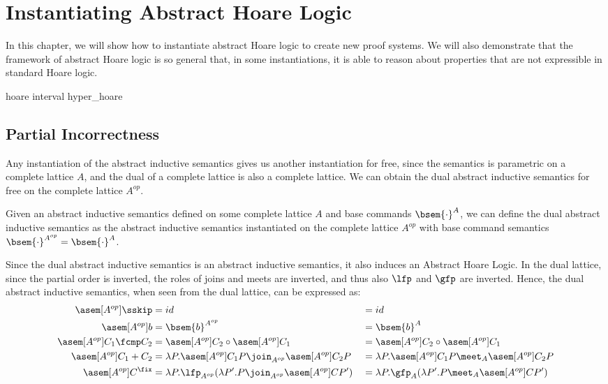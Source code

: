 \chapter{Instantiating Abstract Hoare Logic}

In this chapter, we will show how to instantiate abstract Hoare logic to create 
new proof systems. We will also demonstrate that the framework of abstract Hoare 
logic is so general that, in some instantiations, it is able to reason about 
properties that are not expressible in standard Hoare logic.

{hoare}
{interval}
{hyper_hoare}

\section{Partial Incorrectness}

Any instantiation of the abstract inductive semantics gives us another
instantiation for free, since the semantics is parametric on a complete lattice
$A$, and the dual of a complete lattice is also a complete lattice. We can
obtain the dual abstract inductive semantics for free on the complete lattice
$A^{op}$.

\begin{definition}
  Given an abstract inductive semantics defined on some complete lattice $A$
  and base commands $\bsem{\cdot}^A$, we can define the dual abstract inductive
  semantics as the abstract inductive semantics instantiated on the 
  complete lattice $A^{op}$ with base command semantics $\bsem{\cdot}^{A^{op}}
  = \bsem{\cdot}^A$.
\end{definition}

Since the dual abstract inductive semantics is an abstract inductive semantics,
it also induces an Abstract Hoare Logic. In the dual lattice, since the partial
order is inverted, the roles of joins and meets are inverted, and thus also
$\lfp$ and $\gfp$ are inverted. Hence, the dual abstract inductive semantics,
when seen from the dual lattice, can be expressed as: 
\begin{align*}
  \asem[A^{op}]{\sskip}        &= id &&= id \\
  \asem[A^{op}]{b}             &= \bsem{b}^{A^{op}} &&= \bsem{b}^A \\
  \asem[A^{op}]{C_1 \fcmp C_2} &= \asem[A^{op}]{C_2} \circ \asem[A^{op}]{C_1} &&= \asem[A^{op}]{C_2} \circ \asem[A^{op}]{C_1} \\
  \asem[A^{op}]{C_1 + C_2}     &= \lambda P . \asem[A^{op}]{C_1} P \join_{A^{op}} \asem[A^{op}]{C_2} P &&= \lambda P . \asem[A^{op}]{C_1} P \meet_A \asem[A^{op}]{C_2} P \\
  \asem[A^{op}]{C^\fix}        &= \lambda P . \lfp_{A^{op}}(\lambda P'. P \join_{A^{op}} \asem[A^{op}]{C} P') &&= \lambda P . \gfp_{A}(\lambda P'. P \meet_A \asem[A^{op}]{C} P')
\end{align*}

